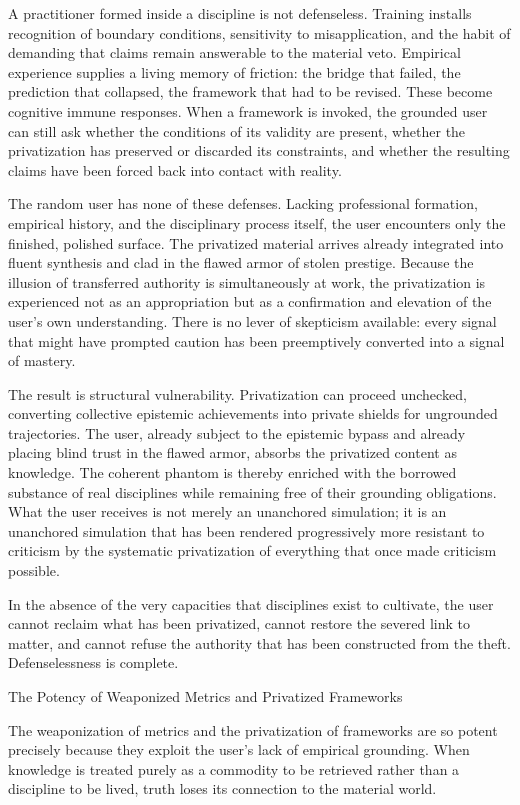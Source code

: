 A practitioner formed inside a discipline is not defenseless. Training installs recognition of boundary conditions, sensitivity to misapplication, and the habit of demanding that claims remain answerable to the material veto. Empirical experience supplies a living memory of friction: the bridge that failed, the prediction that collapsed, the framework that had to be revised. These become cognitive immune responses. When a framework is invoked, the grounded user can still ask whether the conditions of its validity are present, whether the privatization has preserved or discarded its constraints, and whether the resulting claims have been forced back into contact with reality.

The random user has none of these defenses. Lacking professional formation, empirical history, and the disciplinary process itself, the user encounters only the finished, polished surface. The privatized material arrives already integrated into fluent synthesis and clad in the flawed armor of stolen prestige. Because the illusion of transferred authority is simultaneously at work, the privatization is experienced not as an appropriation but as a confirmation and elevation of the user’s own understanding. There is no lever of skepticism available: every signal that might have prompted caution has been preemptively converted into a signal of mastery.

The result is structural vulnerability. Privatization can proceed unchecked, converting collective epistemic achievements into private shields for ungrounded trajectories. The user, already subject to the epistemic bypass and already placing blind trust in the flawed armor, absorbs the privatized content as knowledge. The coherent phantom is thereby enriched with the borrowed substance of real disciplines while remaining free of their grounding obligations. What the user receives is not merely an unanchored simulation; it is an unanchored simulation that has been rendered progressively more resistant to criticism by the systematic privatization of everything that once made criticism possible.

In the absence of the very capacities that disciplines exist to cultivate, the user cannot reclaim what has been privatized, cannot restore the severed link to matter, and cannot refuse the authority that has been constructed from the theft. Defenselessness is complete.

The Potency of Weaponized Metrics and Privatized Frameworks

The weaponization of metrics and the privatization of frameworks are so potent precisely because they exploit the user’s lack of empirical grounding. When knowledge is treated purely as a commodity to be retrieved rather than a discipline to be lived, truth loses its connection to the material world.

